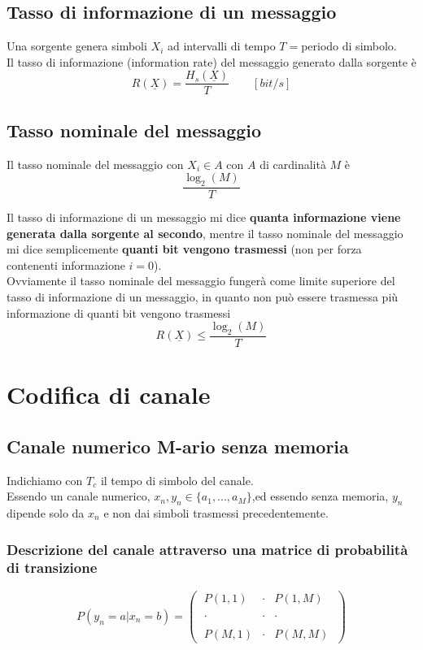 \documentclass{article}
\begin{document}
\subsection{Tasso di informazione di un messaggio}
Una sorgente genera simboli $X_i$ ad intervalli di tempo $T=$periodo di simbolo.\\
Il tasso di informazione (information rate) del messaggio generato dalla sorgente è $$R(\underline{X})=\frac{H_s(\underline{X})}{T}\qquad[bit/s]$$

\subsection{Tasso nominale del messaggio}
Il tasso nominale del messaggio con $X_i\in A$ con $A$ di cardinalità $M$ è $$\frac{\log_2(M)}{T}$$

Il tasso di informazione di un messaggio mi dice \textbf{quanta informazione viene generata dalla sorgente al secondo}, mentre il tasso nominale del messaggio mi dice semplicemente \textbf{quanti bit vengono trasmessi} (non per forza contenenti informazione $i=0$).\\
Ovviamente il tasso nominale del messaggio fungerà come limite superiore del tasso di informazione di un messaggio, in quanto non può essere trasmessa più informazione di quanti bit vengono trasmessi
$$R(\underline{X})\leq \frac{\log_2(M)}{T}$$








\newpage
\section{Codifica di canale}
\subsection{Canale numerico M-ario senza memoria}
Indichiamo con $T_c$ il tempo di simbolo del canale.\\
Essendo un canale numerico, $x_n, y_n\in\{a_1,...,a_M\}$,ed essendo senza memoria, $y_n$ dipende solo da $x_n$ e non dai simboli trasmessi precedentemente.\\

\subsubsection{Descrizione del canale attraverso una matrice di probabilità di transizione}
$$P(y_n=a|x_n=b)=\left(\;\begin{array}{ccc}
	P(1,1)&\cdot&P(1,M)\\\\
	\cdot&\cdot&\cdot\\\\
	P(M,1)&\cdot&P(M,M)
\end{array}\;\right)$$
\end{document}
